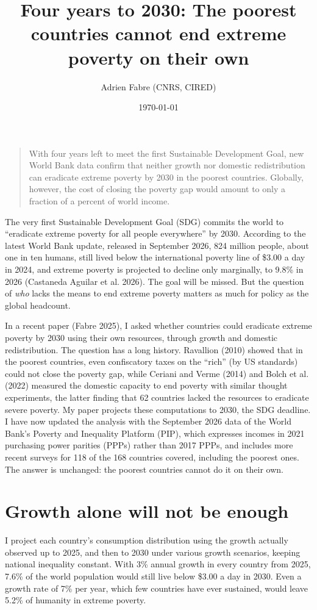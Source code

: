 \documentclass[11pt,english]{article}
\title{Four years to 2030: The poorest countries cannot end extreme poverty on their own}
\author{Adrien Fabre (CNRS, CIRED)}
\date{\today}
\begin{document}
\maketitle
\begin{quote}With four years left to meet the first Sustainable Development Goal, new World Bank data confirm that neither growth nor domestic redistribution can eradicate extreme poverty by 2030 in the poorest countries. Globally, however, the cost of closing the poverty gap would amount to only a fraction of a percent of world income.\end{quote}


The very first Sustainable Development Goal (SDG) commits the world to ``eradicate extreme poverty for all people everywhere'' by 2030. According to the latest World Bank update, released in September 2026, 824 million people, about one in ten humans, still lived below the international poverty line of \$3.00 a day in 2024, and extreme poverty is projected to decline only marginally, to 9.8\% in 2026 (Castaneda Aguilar et al. 2026). The goal will be missed. But the question of \emph{who} lacks the means to end extreme poverty matters as much for policy as the global headcount.

In a recent paper (Fabre 2025), I asked whether countries could eradicate extreme poverty by 2030 using their own resources, through growth and domestic redistribution. The question has a long history. Ravallion (2010) showed that in the poorest countries, even confiscatory taxes on the ``rich'' (by US standards) could not close the poverty gap, while Ceriani and Verme (2014) and Bolch et al. (2022) measured the domestic capacity to end poverty with similar thought experiments, the latter finding that 62 countries lacked the resources to eradicate severe poverty. My paper projects these computations to 2030, the SDG deadline. I have now updated the analysis with the September 2026 data of the World Bank's Poverty and Inequality Platform (PIP), which expresses incomes in 2021 purchasing power parities (PPPs) rather than 2017 PPPs, and includes more recent surveys for 118 of the 168 countries covered, including the poorest ones. The answer is unchanged: the poorest countries cannot do it on their own.

\section*{Growth alone will not be enough}

I project each country's consumption distribution using the growth actually observed up to 2025, and then to 2030 under various growth scenarios, keeping national inequality constant. With 3\% annual growth in every country from 2025, 7.6\% of the world population would still live below \$3.00 a day in 2030. Even a growth rate of 7\% per year, which few countries have ever sustained, would leave 5.2\% of humanity in extreme poverty.
\end{document}
